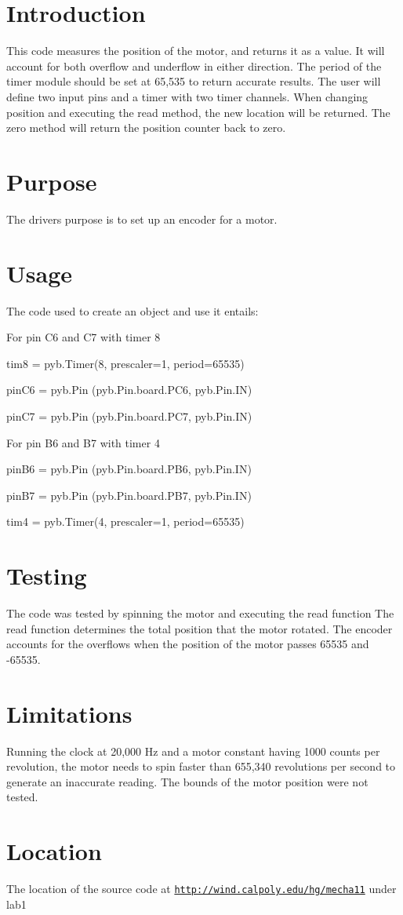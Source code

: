\hypertarget{index_Introduction}{}\section{Introduction}\label{index_Introduction}
This code measures the position of the motor, and returns it as a value. It will account for both overflow and underflow in either direction. The period of the timer module should be set at 65,535 to return accurate results. The user will define two input pins and a timer with two timer channels. When changing position and executing the read method, the new location will be returned. The zero method will return the position counter back to zero.\hypertarget{index_Purpose}{}\section{Purpose}\label{index_Purpose}
The drivers purpose is to set up an encoder for a motor.\hypertarget{index_Usage}{}\section{Usage}\label{index_Usage}
The code used to create an object and use it entails\+: \begin{DoxyVerb}  For pin C6 and C7 with timer 8

      tim8 = pyb.Timer(8, prescaler=1, period=65535)

      pinC6 = pyb.Pin (pyb.Pin.board.PC6, pyb.Pin.IN)

      pinC7 = pyb.Pin (pyb.Pin.board.PC7, pyb.Pin.IN)

  For pin B6 and B7 with timer 4

      pinB6 = pyb.Pin (pyb.Pin.board.PB6, pyb.Pin.IN)

      pinB7 = pyb.Pin (pyb.Pin.board.PB7, pyb.Pin.IN)

      tim4 = pyb.Timer(4, prescaler=1, period=65535)
\end{DoxyVerb}
\hypertarget{index_Testing}{}\section{Testing}\label{index_Testing}
The code was tested by spinning the motor and executing the read function The read function determines the total position that the motor rotated. The encoder accounts for the overflows when the position of the motor passes 65535 and -\/65535.\hypertarget{index_Limitations}{}\section{Limitations}\label{index_Limitations}
Running the clock at 20,000 Hz and a motor constant having 1000 counts per revolution, the motor needs to spin faster than 655,340 revolutions per second to generate an inaccurate reading. The bounds of the motor position were not tested.\hypertarget{index_Location}{}\section{Location}\label{index_Location}
The location of the source code at \href{http://wind.calpoly.edu/hg/mecha11}{\tt http\+://wind.\+calpoly.\+edu/hg/mecha11} under lab1 